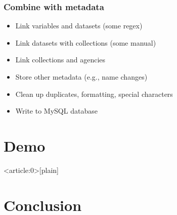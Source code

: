 \documentclass{beamer}
\begin{document}
\begin{frame}
    \frametitle{Combine with metadata}

    \begin{itemize}
        \item Link variables and datasets (some regex)
        \item Link datasets with collections (some manual)
        \item Link collections and agencies
        \item Store other metadata (e.g., name changes)
        \item Clean up duplicates, formatting, special characters
        \item Write to MySQL database
    \end{itemize}
\end{frame}

\section{Demo}


{ %
\begin{frame}<article:0>[plain]
\end{frame}


}

\section{Conclusion}
\end{document}
